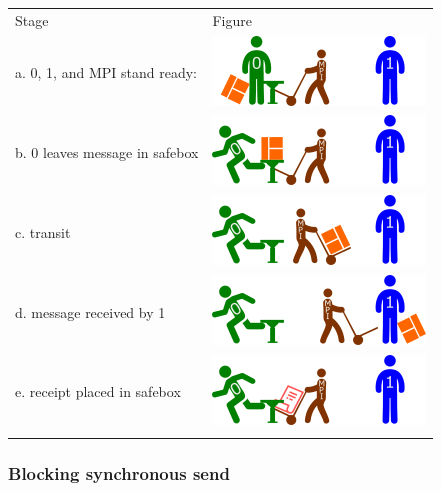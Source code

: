 \begin{longtable}[c]{@{}ll@{}}
\toprule\addlinespace
Stage & Figure
\\\addlinespace
\midrule\endhead
a. 0, 1, and MPI stand ready: &
\includegraphics{06MPI/figures/async0.png}
\\\addlinespace
b. 0 leaves message in safebox &
\includegraphics{06MPI/figures/async1.png}
\\\addlinespace
c. transit & \includegraphics{06MPI/figures/asyncT.png}
\\\addlinespace
d. message received by 1 & \includegraphics{06MPI/figures/asyncA.png}
\\\addlinespace
e. receipt placed in safebox &
\includegraphics{06MPI/figures/asyncR.png}
\\\addlinespace
\bottomrule
\end{longtable}

\subsubsection{Blocking synchronous
send}\label{blocking-synchronous-send-1}

\begin{Shaded}
\begin{Highlighting}[]
      
\end{Highlighting}
\end{Shaded}

